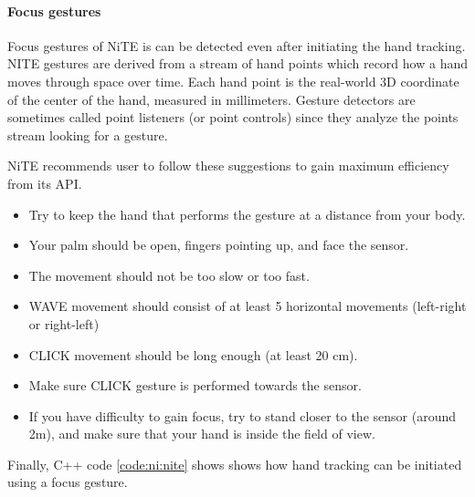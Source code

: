 

\paragraph*{Focus gestures} Focus gestures of NiTE is can be detected even after initiating the hand tracking. NITE gestures are derived from a stream of hand points which record how a hand moves through space over time. Each hand point is the real-world 3D coordinate of the center of the hand, measured in millimeters. Gesture detectors are sometimes called point listeners (or point controls) since they analyze the points stream looking for a gesture. 

NiTE recommends user to follow these suggestions to gain maximum efficiency from its API. 
\begin{itemize}
	\item Try to keep the hand that performs the gesture at a distance from your body. 
	\item Your palm should be open, fingers pointing up, and face the sensor. 
	\item The movement should not be too slow or too fast. 
	\item WAVE movement should consist of at least 5 horizontal movements (left-right or right-left) 
	\item CLICK movement should be long enough (at least 20 cm). 
	\item Make sure CLICK gesture is performed towards the sensor. 
	\item If you have difficulty to gain focus, try to stand closer to the sensor (around 2m), and make sure that your hand is inside the field of view. 
\end{itemize}

Finally, C++ code \ref{code:ni:nite} shows shows how hand tracking can be initiated using a focus gesture. 

 \label{code:ni:nite}